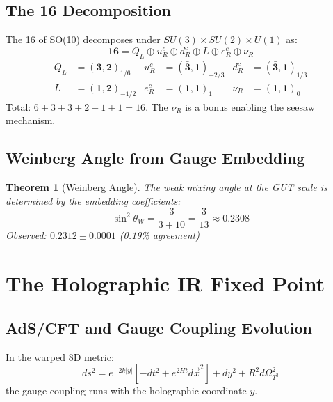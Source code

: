 \documentclass[12pt,a4paper]{article}
\newtheorem{theorem}{Theorem}[section]
\begin{document}
\subsection{The 16 Decomposition}

The 16 of SO(10) decomposes under $SU(3) \times SU(2) \times U(1)$ as:
\begin{equation}
\mathbf{16} = Q_L \oplus u_R^c \oplus d_R^c \oplus L \oplus e_R^c \oplus \nu_R
\end{equation}
\begin{align}
Q_L &= (\mathbf{3}, \mathbf{2})_{1/6} & u_R^c &= (\bar{\mathbf{3}}, \mathbf{1})_{-2/3} & d_R^c &= (\bar{\mathbf{3}}, \mathbf{1})_{1/3} \\
L &= (\mathbf{1}, \mathbf{2})_{-1/2} & e_R^c &= (\mathbf{1}, \mathbf{1})_{1} & \nu_R &= (\mathbf{1}, \mathbf{1})_{0}
\end{align}
Total: $6+3+3+2+1+1 = 16$. The $\nu_R$ is a bonus enabling the seesaw mechanism.

\subsection{Weinberg Angle from Gauge Embedding}

\begin{theorem}[Weinberg Angle]
The weak mixing angle at the GUT scale is determined by the embedding coefficients:
\begin{equation}
\sin^2\theta_W = \frac{3}{3+10} = \frac{3}{13} \approx 0.2308
\end{equation}
Observed: $0.2312 \pm 0.0001$ (0.19\% agreement)
\end{theorem}

\section{The Holographic IR Fixed Point}

\subsection{AdS/CFT and Gauge Coupling Evolution}

In the warped 8D metric:
\begin{equation}
ds^2 = e^{-2k|y|}\left[-dt^2 + e^{2Ht}d\vec{x}^2\right] + dy^2 + R^2 d\Omega_{T^3}^2
\end{equation}
the gauge coupling runs with the holographic coordinate $y$.
\end{document}
